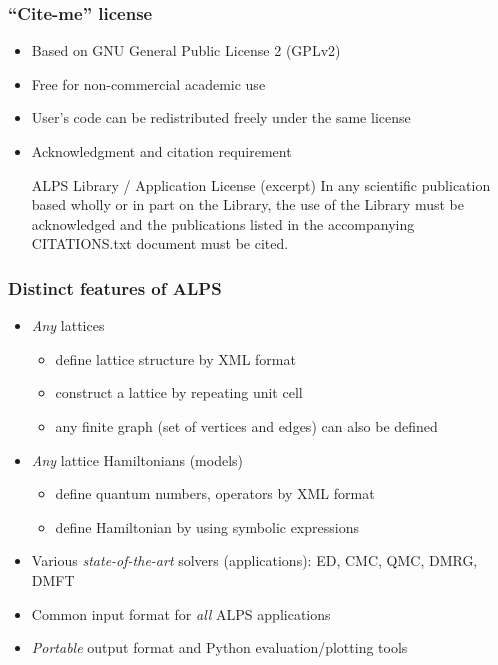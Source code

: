 \begin{frame}[t,fragile]
\frametitle{``Cite-me'' license}
  \begin{itemize}
  \item Based on GNU General Public License 2 (GPLv2)
  \item Free for non-commercial academic use
  \item User's code can be redistributed freely under the same license
  \item Acknowledgment and citation requirement
    \begin{minipage}{.9\textwidth}
    \begin{block}{ALPS Library / Application License (excerpt)}
      In any scientific publication based wholly or in part on the
      Library, the use of the Library must be acknowledged and the
      publications listed in the accompanying CITATIONS.txt document
      must be cited.
    \end{block}
    \end{minipage}
  \end{itemize}
\end{frame}

\begin{frame}[t,fragile]
  \frametitle{Distinct features of ALPS}
  \begin{itemize}
  \item {\em \color{red} Any} lattices
    \begin{itemize}
    \item define lattice structure by XML format
    \item construct a lattice by repeating unit cell
    \item any finite graph (set of vertices and edges) can also be defined
    \end{itemize}
  \item {\em \color{red} Any} lattice Hamiltonians (models)
    \begin{itemize}
    \item define quantum numbers, operators by XML format
    \item define Hamiltonian by using symbolic expressions
    \end{itemize}
  \item Various {\em \color{red} state-of-the-art} solvers (applications): ED, CMC, QMC, DMRG, DMFT
  \item Common input format for {\em \color{red} all} ALPS applications
  \item {\em \color{red} Portable} output format and Python evaluation/plotting tools
  \end{itemize}
\end{frame}

